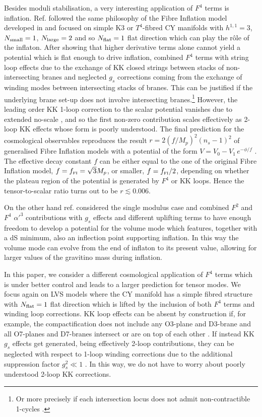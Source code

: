 \documentclass[11pt,a4paper]{article}
\begin{document}
Besides moduli stabilisation, a very interesting application of $F^4$ terms is inflation. Ref. \cite{Broy:2015zba} followed the same philosophy of the Fibre Inflation model developed in \cite{Cicoli:2008gp} and focused on simple K3 or $T^4$-fibred CY manifolds with $h^{1,1}=3$, $N_{\rm small}=1$, $N_{\rm large}=2$ and so $N_{\rm flat}=1$ flat direction which can play the r\^ole of the inflaton. After showing that higher derivative terms alone cannot yield a potential which is flat enough to drive inflation, \cite{Broy:2015zba} combined $F^4$ terms with string loop effects due to the exchange of KK closed strings between stacks of non-intersecting branes and neglected $g_s$ corrections coming from the exchange of winding modes between intersecting stacks of branes. This can be justified if the underlying brane set-up does not involve intersecting branes.\footnote{Or more precisely if each intersection locus does not admit non-contractible 1-cycles \cite{Berg:2007wt}.} However, the leading order KK 1-loop correction to the scalar potential vanishes due to extended no-scale \cite{Cicoli:2007xp}, and so the first non-zero contribution scales effectively as 2-loop KK effects whose form is poorly understood. The final prediction for the cosmological observables reproduces the result $r= 2 (f/M_p)^2 (n_s-1)^2$ of generalised Fibre Inflation models with a potential of the form $V=V_0-V_1\,e^{-\phi/f}$ \cite{Burgess:2016owb}. The effective decay constant $f$ can be either equal to the one of the original Fibre Inflation model, $f=f_{\scriptscriptstyle \rm FI}=\sqrt{3} M_p$, or smaller, $f=f_{\scriptscriptstyle \rm FI}/2$, depending on whether the plateau region of the potential is generated by $F^4$ or KK loops. Hence the tensor-to-scalar ratio turns out to be $r\lesssim 0.006$.

On the other hand ref. \cite{Cicoli:2015wja} considered the single modulus case and combined $F^2$ and $F^4$ $\alpha'^3$ contributions with $g_s$ effects and different uplifting terms to have enough freedom to develop a potential for the volume mode which features, together with a dS minimum, also an inflection point supporting inflation. In this way the volume mode can evolve from the end of inflaton to its present value, allowing for larger values of the gravitino mass during inflation. 

In this paper, we consider a different cosmological application of $F^4$ terms which is under better control and leads to a larger prediction for tensor modes. We focus again on LVS models where the CY manifold has a simple fibred structure with $N_{\rm flat}=1$ flat direction which is lifted by the inclusion of both $F^4$ terms and winding loop corrections. KK loop effects can be absent by construction if, for example, the compactification does not include any O3-plane and D3-brane and all O7-planes and D7-branes intersect or are on top of each other \cite{Berg:2007wt}. If instead KK $g_s$ effects get generated, being effectively 2-loop contributions, they can be neglected with respect to 1-loop winding corrections due to the additional suppression factor $g_s^2\ll 1$ \cite{Burgess:2016owb}. In this way, we do not have to worry about poorly understood 2-loop KK corrections. 
\end{document}
